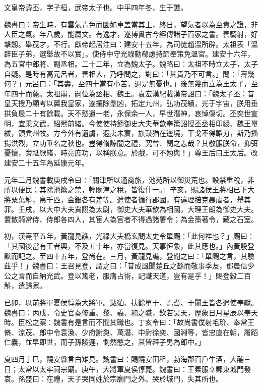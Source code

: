 
\begin{pinyinscope}
文皇帝諱丕，字子桓，武帝太子也。中平四年冬，生于譙。

魏書曰：帝生時，有雲氣青色而圜如車盖當其上，終日，望氣者以為至貴之證，非人臣之氣。年八歲，能屬文。有逸才，遂博貫古今經傳諸子百家之書。善騎射，好擊劔。舉茂才，不行。獻帝起居注曰：建安十五年，為司徒趙溫所辟。太祖表「溫辟臣子弟，選舉故不以實」。使侍中守光祿勳郗慮持節奉策免溫官。建安十六年，為五官中郎將、副丞相。二十二年，立為魏太子。魏略曰：太祖不時立太子，太子自疑。是時有高元呂者，善相人，乃呼問之，對曰：「其貴乃不可言。」問：「壽幾何？」元呂曰：「其壽，至四十當有小苦，過是無憂也。」後無幾而立為王太子，至年四十而薨。太祖崩，嗣位為丞相、魏王。袁宏漢紀載漢帝詔曰：「魏太子丕：昔皇天授乃顯考以翼我皇家，遂攘除羣凶，拓定九州，弘功茂績，光于宇宙，朕用垂拱負扆二十有餘載。天不憖遺一老，永保余一人，早世潛神，哀悼傷切。丕奕世宣明，宜秉文武，紹熈前緒。今使使持節御史大夫華歆奉策詔授丕丞相印綬、魏王璽紱，領兾州牧。方今外有遺虜，遐夷未賔，旗鼓猶在邊境，干戈不得韜刃，斯乃播揚洪烈，立功垂名之秋也。豈得脩諒闇之禮，究曾、閔之志哉？其敬服朕命，抑弭憂懷，旁祗厥緒，時亮庶功，以稱朕意。於戲，可不勉與！」尊王后曰王太后。改建安二十五年為延康元年。

元年二月魏書載庚戌令曰：「關津所以通商旅，池苑所以御災荒也。設禁重稅，非所以便民；其除池籞之禁，輕關津之稅，皆復什一。」辛亥，賜諸侯王將相已下大將粟萬斛，帛千匹，金銀各有差等。遣使者循行郡國，有違理掊克暴虐者，舉其罪。壬戌，以大中大夫賈詡為太尉，御史大夫華歆為相國，大理王朗為御史大夫。置散騎常侍、侍郎各四人，其宦人為官者不得過諸署令；為金策著令，藏之石室。

初，漢熹平五年，黃龍見譙，光祿大夫橋玄問太史令單颺：「此何祥也？」颺曰：「其國後當有王者興，不及五十年，亦當復見。天事恒象，此其應也。」內黃殷登默而記之。至四十五年，登尚在。三月，黃龍見譙，登聞之曰：「單颺之言，其驗茲乎！」魏書曰：王召見登，謂之曰：「昔成風聞楚丘之繇而敬事季友，鄧晨信少公之言而自納光武。登以篤老，服膺占術，記識天道，豈有是乎！」賜登穀二百斛，遣歸家。

已卯，以前將軍夏侯惇為大將軍。濊貃、扶餘單于、焉耆、于闐王皆各遣使奉獻。魏書曰：丙戌，令史官奏修重、黎、羲、和之職，欽若昊天，歷象日月星辰以奉天時。臣松之案：魏書有是言而不聞其職也。丁亥令曰：「故尚書僕射毛玠、奉常王脩、涼茂、郎中令袁渙、少府謝奐、萬潛、中尉徐奕、國淵等，皆忠直在朝，履蹈仁義，並早即世，而子孫陵遲，惻然愍之，其皆拜子男為郎中。」

夏四月丁巳，饒安縣言白雉見。魏書曰：賜饒安田租，勃海郡百戶牛酒，大酺三日；太常以太牢祠宗廟。庚午，大將軍夏侯惇薨。魏書曰：王素服幸鄴東城門發哀。孫盛曰：在禮，天子哭同姓於宗廟門之外。哭於城門，失其所也。


\end{pinyinscope}
